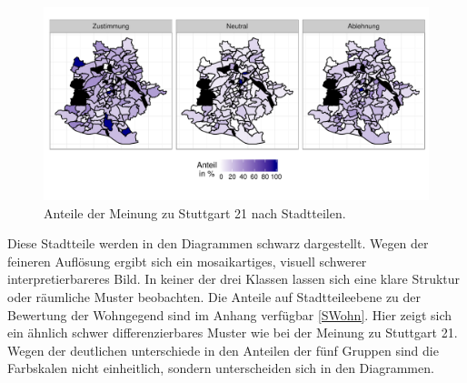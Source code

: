 \documentclass{Vorlage}
\begin{document}
\begin{figure}[h]
 \begin{center}
 \includegraphics[scale=0.8]{Pictures/SStuttgart3}
 \caption{Anteile der Meinung zu Stuttgart 21 nach Stadtteilen.}
 \label{SStuttgart21}
 \end{center}
\end{figure}

Diese Stadtteile werden in den Diagrammen schwarz dargestellt. Wegen der feineren Auflösung ergibt sich ein mosaikartiges, visuell schwerer interpretierbareres Bild. In keiner der drei Klassen lassen sich eine klare Struktur oder räumliche Muster beobachten. Die Anteile auf Stadtteileebene zu der Bewertung der Wohngegend sind im Anhang verfügbar \ref{SWohn}. Hier zeigt sich ein ähnlich schwer differenzierbares Muster wie bei der Meinung zu Stuttgart 21. Wegen der deutlichen unterschiede in den Anteilen der fünf Gruppen sind die Farbskalen nicht einheitlich, sondern unterscheiden sich in den Diagrammen.\\
\end{document}
